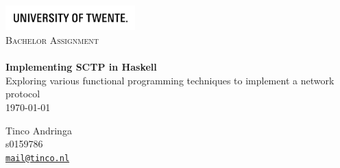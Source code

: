 \begin{titlepage}

\begin{center}

\includegraphics[width=50mm]{UT_Logo_Black_EN.jpg}\\[1.5cm]
\textsc{\Large Bachelor Assignment}\\[0.5cm]
\HRule \\[0.4cm]
{ \huge \bfseries Implementing SCTP in Haskell}\\[0.4cm]
{\large Exploring various functional programming techniques to implement a network protocol}
\HRule \\[1.5cm]
{\large \today}
\vfill
\begin{minipage}{0.4\textwidth}
\begin{flushleft} \large
Tinco Andringa\\
s0159786\\
\href{mailto:mail@tinco.nl}{\nolinkurl{mail@tinco.nl}} \\[0.5cm]
\end{flushleft}
\end{minipage}
\end{center}
\end{titlepage}
